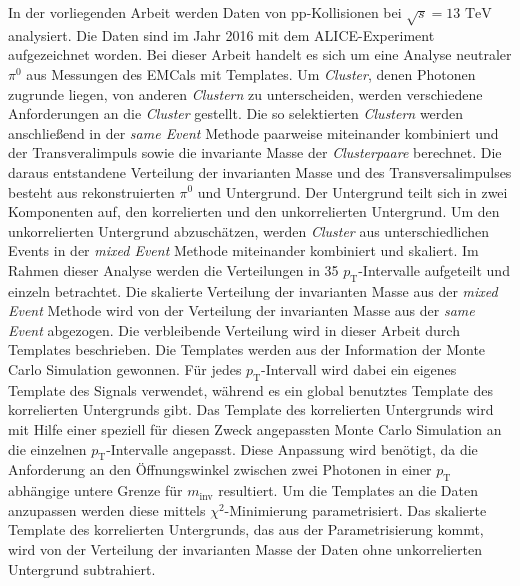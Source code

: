 In der vorliegenden Arbeit werden Daten von pp-Kollisionen bei $\sqrt{s}=13\text{ TeV}$ analysiert.
Die Daten sind im Jahr 2016 mit dem ALICE-Experiment aufgezeichnet worden.
Bei dieser Arbeit handelt es sich um eine Analyse neutraler $\pi^{0}$ aus Messungen des EMCals mit Templates. %
\newline
Um \textit{Cluster}, denen Photonen zugrunde liegen, von anderen \textit{Clustern} zu unterscheiden, werden verschiedene Anforderungen an die \textit{Cluster} gestellt.
Die so selektierten \textit{Clustern} werden anschließend in der \textit{same Event} Methode paarweise miteinander kombiniert und der Transveralimpuls sowie die invariante Masse der \textit{Clusterpaare} berechnet.
\newline
Die daraus entstandene Verteilung der invarianten Masse und des Transversalimpulses besteht aus rekonstruierten $\pi^{0}$ und Untergrund.
Der Untergrund teilt sich in zwei Komponenten auf, den kor\-re\-lier\-ten und den unkorrelierten Untergrund.
Um den unkorrelierten Untergrund abzuschätzen, werden \textit{Cluster} aus unterschiedlichen Events in der \textit{mixed Event} Methode miteinander kombiniert und skaliert.
\newline
Im Rahmen dieser Analyse werden die Verteilungen in 35 $p_\text{T}$-Intervalle aufgeteilt und einzeln betrachtet.
Die skalierte Verteilung der invarianten Masse aus der \textit{mixed Event} Methode wird von der Verteilung der invarianten Masse aus der \textit{same Event} abgezogen.
\newline
Die verbleibende Verteilung wird in dieser Arbeit durch Templates beschrieben.
Die Templates werden aus der Information der Monte Carlo Simulation gewonnen.
Für jedes $p_\text{T}$-Intervall wird dabei ein eigenes Template des Signals verwendet, während es ein global benutztes Template des korrelierten Untergrunds gibt.
Das Template des korrelierten Untergrunds wird mit Hilfe einer speziell für diesen Zweck angepassten Monte Carlo Simulation an die einzelnen $p_\text{T}$-Intervalle angepasst.
Diese Anpassung wird benötigt, da die Anforderung an den Öffnungswinkel zwischen zwei Photonen in einer $p_\text{T}$ abhängige untere Grenze für $m_\text{inv}$ resultiert.
\newline
Um die Templates an die Daten anzupassen werden diese mittels $\chi^{2}$-Minimierung parametrisiert.
Das skalierte Template des korrelierten Untergrunds, das aus der Parametrisierung kommt, wird von der Verteilung der invarianten Masse der Daten ohne unkorrelierten Untergrund subtrahiert.
